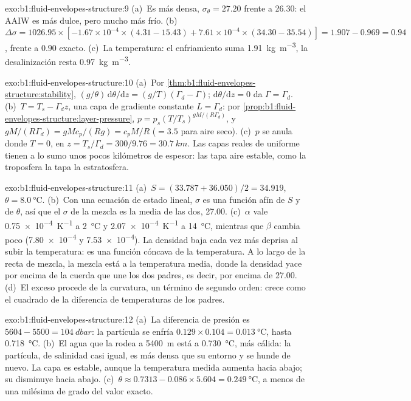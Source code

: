 \begin{solution}{exo:b1:fluid-envelopes-structure:9}
(a)~Es más densa, $\sigma_\theta = 27.20$ frente a 26.30: el AAIW es más dulce,
pero mucho más frío. (b)~$\Delta\sigma = 1026.95 \times [-1.67\times10^{-4} \times
(4.31 - 15.43) + 7.61\times10^{-4} \times (34.30 - 35.54)] = 1.907 - 0.969 =
0.94$, frente a $0.90$ exacto. (c)~La temperatura: el enfriamiento suma
\qty{1.91}{kg.m^{-3}}, la desalinización resta \qty{0.97}{kg.m^{-3}}.
\end{solution}

\begin{solution}{exo:b1:fluid-envelopes-structure:10}
(a)~Por \cref{thm:b1:fluid-envelopes-structure:stability}, $(g/\theta)\,\mathrm
d\theta/\mathrm dz = (g/T)(\Gamma_d - \Gamma)$; $\mathrm d\theta/\mathrm dz = 0$ da $\Gamma = \Gamma_d$. (b)~$T = T_s - \Gamma_d z$, una capa de gradiente constante
$L = \Gamma_d$: por \cref{prop:b1:fluid-envelopes-structure:layer-pressure}, $p =
p_s (T/T_s)^{gM/(R\Gamma_d)}$, y $gM/(R\Gamma_d) = gMc_p/(Rg) = c_pM/R$
($= 3.5$ para aire seco). (c)~$p$ se anula donde $T = 0$, en $z = T_s/\Gamma_d =
300/9.76 = \qty{30.7}{km}$. Las capas reales de  uniforme tienen a lo sumo unos pocos kilómetros de espesor: las tapa aire estable, como la troposfera la tapa la estratosfera.
\end{solution}

\begin{solution}{exo:b1:fluid-envelopes-structure:11}
(a)~$S = (33.787 + 36.050)/2 = 34.919$, $\theta = \qty{8.0}{\celsius}$.
(b)~Con una ecuación de estado lineal, $\sigma$ es una función afín de $S$ y de
$\theta$, así que el $\sigma$ de la mezcla es la media de las dos, 27.00.
(c)~$\alpha$ vale \qty{0.75e-4}{K^{-1}} a \qty{2}{\celsius} y
\qty{2.07e-4}{K^{-1}} a \qty{14}{\celsius}, mientras que $\beta$ cambia poco
(\num{7.80e-4} y \num{7.53e-4}). La densidad baja cada vez más deprisa al subir la temperatura: es una función cóncava de la temperatura. A lo largo de la recta de mezcla, la mezcla está a la temperatura media, donde la densidad yace por encima de la cuerda que une los dos padres, es decir, por encima de 27.00. (d)~El exceso procede de la curvatura, un término de segundo orden: crece como el cuadrado de la diferencia de temperaturas de los padres.
\end{solution}

\begin{solution}{exo:b1:fluid-envelopes-structure:12}
(a)~La diferencia de presión es $5604 - 5500 = \qty{104}{dbar}$: la partícula se enfría
$0.129 \times 0.104 = \qty{0.013}{\celsius}$, hasta \qty{0.718}{\celsius}.
(b)~El agua que la rodea a \qty{5400}{m} está a \qty{0.730}{\celsius}, más cálida: la partícula, de salinidad casi igual, es más densa que su entorno y se hunde de nuevo. La capa es estable, aunque la temperatura medida aumenta hacia abajo; su  disminuye hacia abajo. (c)~$\theta \approx
0.7313 - 0.086 \times 5.604 = \qty{0.249}{\celsius}$, a menos de una milésima de grado del valor exacto.
\end{solution}

